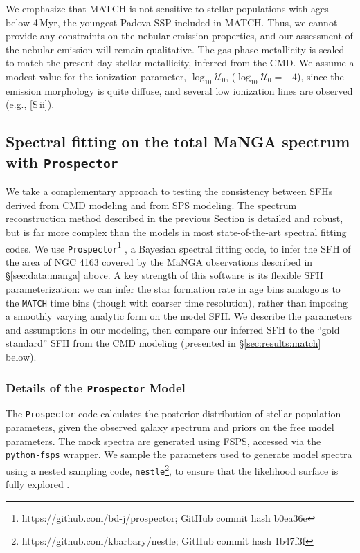 \documentclass[preprint2]{aastex62}
\newcommand{\sii}{[S\,{\sc ii}]\xspace}
\newcommand{\logten}{\ensuremath{\log_{10}}}
\newcommand{\logU}{\ensuremath{\logten \mathcal{U}_0}}
\newcommand{\logUeq}[1]{\ensuremath{\logten \mathcal{U}_0 = #1}}
\newcommand{\Myr}{$\,$Myr\xspace}
\begin{document}
We emphasize that MATCH is not sensitive to stellar populations with ages below 4\Myr, the youngest Padova SSP included in MATCH. Thus, we cannot provide any constraints on the nebular emission properties, and our assessment of the nebular emission will remain qualitative. The gas phase metallicity is scaled to match the present-day stellar metallicity, inferred from the CMD. We assume a modest value for the ionization parameter, \logU, (\logUeq{-4}), since the emission morphology is quite diffuse, and several low ionization lines are observed (e.g., \sii).

\subsection{Spectral fitting on the total MaNGA spectrum with \texttt{Prospector}} \label{sec:methods:pros}

We take a complementary approach to testing the consistency between SFHs derived from CMD modeling and from SPS modeling. The spectrum reconstruction method described in the previous Section is detailed and robust, but is far more complex than the models in most state-of-the-art spectral fitting codes. We use \texttt{Prospector}\footnote{https://github.com/bd-j/prospector; GitHub commit hash b0ea36e} \citep{Johnson+2017, Leja+2017}, a Bayesian spectral fitting code, to infer the SFH of the area of NGC 4163 covered by the MaNGA observations described in \S\ref{sec:data:manga} above. A key strength of this software is its flexible SFH parameterization: we can infer the star formation rate in age bins analogous to the \texttt{MATCH} time bins (though with coarser time resolution), rather than imposing a smoothly varying analytic form on the model SFH. We describe the parameters and assumptions in our modeling, then compare our inferred SFH to the ``gold standard'' SFH from the CMD modeling (presented in \S\ref{sec:results:match} below). 

\subsubsection{Details of the \texttt{Prospector} Model}

The \texttt{Prospector} code calculates the posterior distribution of stellar population parameters, given the observed galaxy spectrum and priors on the free model parameters. The mock spectra are generated using FSPS, accessed via the \texttt{python-fsps} wrapper. We sample the parameters used to generate model spectra using a nested sampling code, \texttt{nestle}\footnote{https://github.com/kbarbary/nestle; GitHub commit hash 1b47f3f}, to ensure that the likelihood surface is fully explored \citep[e.g.,][]{shaw07, feroz09}. 
\end{document}
